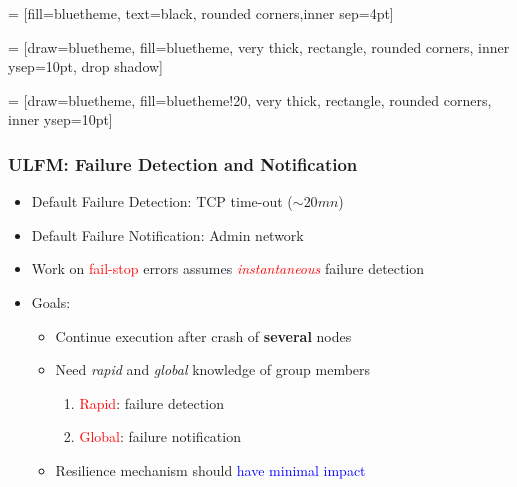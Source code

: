  = [fill=bluetheme, text=black, rounded corners,inner sep=4pt] 

 = [draw=bluetheme, fill=bluetheme, very thick, rectangle, rounded corners, inner ysep=10pt, drop shadow]

 = [draw=bluetheme, fill=bluetheme!20, very thick, rectangle, rounded corners, inner ysep=10pt]


\begin{frame}
  \frametitle{ULFM: Failure Detection and Notification}
  \begin{itemize}
  \item Default Failure Detection: TCP time-out ($\sim 20mn$)
  \item Default Failure Notification: Admin network
  \item Work on \textcolor{red}{fail-stop} errors assumes  \textcolor{red}{\emph{instantaneous}} failure detection
  \item Goals:
    \begin{itemize}
    \item Continue execution after crash of \textbf{several} nodes
    \item Need \emph{rapid} and \emph{global} knowledge of group members
      \begin{enumerate}
      \item \textcolor{red}{Rapid}: failure detection
      \item \textcolor{red}{Global}: failure notification
      \end{enumerate}
    \item Resilience mechanism should \textcolor{blue}{have minimal impact}
    \end{itemize}
  \end{itemize}
\end{frame}

